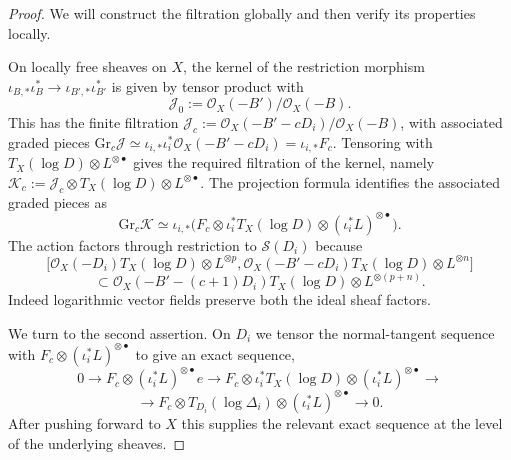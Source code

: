 \documentclass[10pt,a4paper]{amsart}
\newcommand{\OO}{\mathcal{O}}
\begin{document}
\begin{proof} We will construct the filtration globally and then verify its properties locally.


On locally free sheaves on $X$, the kernel of the restriction morphism $\iota_{B,*}\iota_B^*\to\iota_{B',*}\iota_{B'}^*$ is given by tensor product with $$\mathcal{J}_0:=\OO_X(-B')/\OO_X(-B).$$ This has the finite filtration $\mathcal{J}_c:=\OO_X(-B'-cD_i)/\OO_X(-B)$, with associated graded pieces $\mathrm{Gr}_c\mathcal{J}\simeq\iota_{i,*}\iota_i^*\OO_X(-B'-cD_i)=\iota_{i,*}F_c$. Tensoring with $T_X(\log D)\otimes L^{\otimes\bullet}$ gives the required filtration of the kernel, namely $\mathcal{K}_c:=\mathcal{J}_c\otimes T_X(\log D)\otimes L^{\otimes\bullet}$. The projection formula identifies the associated graded pieces as
$$\mathrm{Gr}_c\mathcal{K}\simeq\iota_{i,*}\big(F_c\otimes\iota_i^*T_X(\log D)\otimes(\iota_i^*L)^{\otimes\bullet}\big).$$
The action factors through restriction to $\mathcal{S}(D_i)$ because
$$\big[\OO_X(-D_i)T_X(\log D)\otimes L^{\otimes p},\OO_X(-B'-cD_i)T_X(\log D)\otimes L^{\otimes n}\big]$$
$$\subset\OO_X(-B'-(c+1)D_i)T_X(\log D)\otimes L^{\otimes(p+n)}.$$
Indeed logarithmic vector fields preserve both the ideal sheaf factors.

We turn to the second assertion. On $D_i$ we tensor the normal-tangent sequence with $F_c\otimes(\iota_i^*L)^{\otimes\bullet}$ to give an exact sequence,
$$0\to F_c\otimes(\iota_i^*L)^{\otimes\bullet}e\to F_c\otimes\iota_i^*T_X(\log D)\otimes(\iota_i^*L)^{\otimes\bullet}\to$$ $$\to F_c\otimes T_{D_i}(\log\Delta_i)\otimes(\iota_i^*L)^{\otimes\bullet}\to 0.$$ After pushing forward to $X$ this supplies the relevant exact sequence at the level of the underlying sheaves. 


\end{proof}
\end{document}
